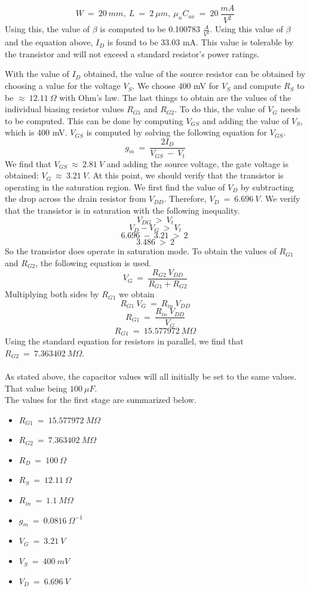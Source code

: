 \documentclass{article}
\begin{document}
    $$ W\ =\ 20\ mm,\ L\ =\ 2\ \mu m,\ \mu_n C_{ox}\ =\ 20\ \frac{mA}{V^2}$$
    Using this, the value of $\beta$ is computed to be 0.100783 $\frac{A}{V^2}$. Using this value of $\beta$ and the equation above, $I_D$ is found to be 33.03 mA. This value is tolerable by the transistor and will not exceed a standard resistor's power ratings. \\ 
    \par
    \quad With the value of $I_D$ obtained, the value of the source resistor can be obtained by choosing a value for the voltage $V_S$. We choose 400 mV for $V_S$ and compute $R_S$ to be $\approx\ 12.11\ \Omega$ with Ohm's law. The last things to obtain are the values of the individual biasing resistor values $R_{G1}$ and $R_{G2}$. To do this, the value of $V_{G}$ needs to be computed. This can be done by computing $V_{GS}$ and adding the value of $V_S$, which is 400 mV. $V_{GS}$ is computed by solving the following equation for $V_{GS}$.
    $$ g_m\ =\ \frac{2I_D}{V_{GS}\ -\ V_t} $$ 
    We find that $V_{GS}\ \approx\ 2.81\ V$ and adding the source voltage, the gate voltage is obtained: $V_G\ \approx\ 3.21\ V$. At this point, we should verify that the transistor is operating in the saturation region. We first find the value of $V_D$ by subtracting the drop across the drain resistor from $V_{DD}$. Therefore, $V_D\ =\ 6.696\ V$. We verify that the transistor is in saturation with the following inequality.
    $$ V_{DG}\ >\ V_t $$
    $$ V_{D} - V_G\ >\ V_t $$
    $$ 6.696\ -\ 3.21\ >\ 2\ $$
    $$ 3.486\ >\ 2 $$
    So the transistor does operate in saturation mode. 
    To obtain the values of $R_{G1}$ and $R_{G2}$, the following equation is used.
    $$ V_G\ =\ \frac{R_{G2}\ V_{DD}}{R_{G1} + R_{G2}}$$
    Multiplying both sides by $R_{G1}$ we obtain
    $$ R_{G1}\ V_G\ =\ R_{in}\ V_{DD}$$
    $$ R_{G1}\ =\ \frac{R_{in}\ V_{DD}}{V_G}$$
    $$ R_{G1}\ =\ 15.577972\ M\Omega$$
    Using the standard equation for resistors in parallel, we find that $R_{G2}\ =\ 7.363402\ M\Omega$. \\ \\
    As stated above, the capacitor values will all initially be set to the same values. That value being $100\ \mu F$. \\ 
    
   \noindent The values for the first stage are summarized below.\\ 
    \begin{itemize}
    \item $R_{G1}\ =\ 15.577972\ M\Omega$ 
    \item $R_{G2}\ =\ 7.363402\ M\Omega$
    \item $R_D\ =\ 100\ \Omega$
    \item $R_S\ =\ 12.11\ \Omega$
    \item $R_{in}\ =\ 1.1\ M\Omega$
    \item $g_m\ =\ 0.0816\ \Omega^{-1}$
    \item $V_G\ =\ 3.21\ V$
    \item $V_S\ =\ 400\ mV$
    \item $V_D\ =\ 6.696\ V$
    \end{itemize}
    
\end{document}
